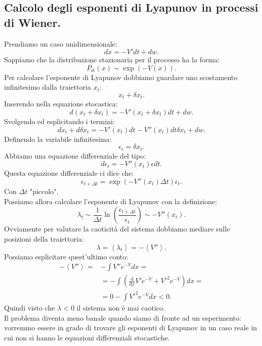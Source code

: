 \subsection{Calcolo degli esponenti di Lyapunov in processi di Wiener.}%
\label{sub:Calcolo degli esponenti di Lyapunov in processi di Wiener.}
Prendiamo un caso unidimensionale:
\[
    dx = -V' dt + dw
.\] 
Sappiamo che la distribuzione stazionaria per il processo ha la forma:
\[
    P_{\text{st}}(x) \sim \exp (-V(x))
.\] 
Per calcolare l'esponente di Lyapunov dobbiamo guardare uno scostamento infinitesimo dalla traiettoria $x_t$:
\[
    x_t + \delta x_t
.\] 
Inserendo nella equazione stocastica:
\[
    d(x_t + \delta x_t) = - V'(x_t + \delta x_t)dt + dw
.\] 
Svolgendo ed esplicitando i termini:
\[
    dx_t + d\delta x_t = -V'(x_t)dt - V''(x_t)dt\delta x_t + dw
.\] 
Definendo la variabile infinitesima:
\[
    \epsilon_t = \delta x_t
.\] 
Abbiamo una equazione differenziale del tipo:
\[
    d\epsilon_t = - V''(x_t)\epsilon dt
.\] 
Questa equazione differenziale ci dice che:
\[
    \epsilon_{t+\Delta t} = \exp\left(-V''(x_t) \Delta t\right)\epsilon_t
.\] 
Con $\Delta t$ "piccolo".\\
Possiamo allora calcolare l'esponente di Lyapunov con la definizione:
\[
    \lambda_t \sim \frac{1}{\Delta t}\ln\left(\frac{\epsilon_{t+\Delta t}}{\epsilon_t}\right) \sim -V''(x_t)
.\] 
Ovviamente per valutare la caoticità del sistema dobbiamo mediare sulle posizioni della traiettoria:
\[
    \lambda  = \left< \lambda_t\right> = - \left<V''\right>
.\] 
Possiamo esplicitare quest'ultimo conto:
\[\begin{aligned}
    -\left<V''\right> =& - \int V''e^{-V}dx =\\ 
		       & = - \int\left(\frac{\text{d} }{\text{d} x} V'e^{-V}+V'^2e^{-V}\right)dx = \\
		       & = 0 - \int  V'^2e^{-V}dx <0
.\end{aligned}\]
Quindi visto che $\lambda < 0 $ il sistema non è mai caotico. \\
Il problema diventa meno banale quando siamo di fronte ad un esperimento: vorremmo essere in grado di trovare gli esponenti di Lyapunov in un caso reale in cui non si hanno le equazioni differenziali stocastiche.
